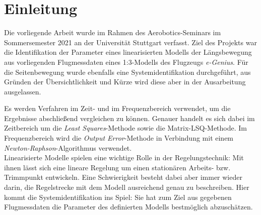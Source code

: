 \chapter{Einleitung}

Die vorliegende Arbeit wurde im Rahmen des Aerobotics-Seminars im Sommersemester 2021 an der Universität Stuttgart verfasst. 
Ziel des Projekts war die Identifikation der Parameter eines linearisierten Modells der Längsbewegung aus vorliegenden 
Flugmessdaten eines 1:3-Modells des Flugzeugs \textit{e-Genius}. Für die Seitenbewegung wurde ebenfalls eine 
Systemidentifikation durchgeführt, aus Gründen der Übersichtlichkeit und Kürze wird diese aber in der Ausarbeitung 
ausgelassen.\par
Es werden Verfahren im Zeit- und im Frequenzbereich verwendet, um die Ergebnisse abschließend vergleichen zu können. Genauer 
handelt es sich dabei im Zeitbereich um die \textit{Least Squares}-Methode sowie die Matrix-LSQ-Methode. Im Frequenzbereich 
wird die \textit{Output Error}-Methode in Verbindung mit einem \textit{Newton-Raphson}-Algorithmus verwendet.\\

Linearisierte Modelle spielen eine wichtige Rolle in der Regelungstechnik: Mit ihnen lässt sich eine lineare Regelung um 
einen stationären Arbeits- bzw. Trimmpunkt entwickeln. Eine Schwierigkeit besteht dabei aber immer wieder darin, die 
Regelstrecke mit dem Modell ausreichend genau zu beschreiben. Hier kommt die Systemidentifikation ins Spiel: Sie hat zum Ziel 
aus gegebenen Flugmessdaten die Parameter des definierten Modells bestmöglich abzuschätzen.

